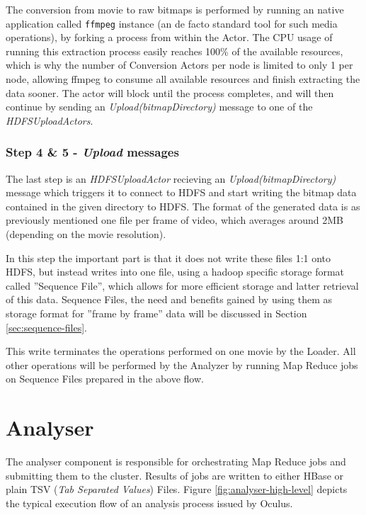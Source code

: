 The conversion from movie to raw bitmaps is performed by running an native application called \verb|ffmpeg| \cite{ffmpeg} instance (an de facto standard tool for such media operations), by forking a process from within the Actor. The CPU usage of running this extraction process easily reaches 100\% of the available resources, which is why the number of Conversion Actors per node is limited to only 1 per node, allowing ffmpeg to consume all available resources and finish extracting the data sooner. The actor will block until the process completes, and will then continue by sending an \textit{Upload(bitmapDirectory)} message to one of the \textit{HDFSUploadActors}.

\subsubsection{Step 4 \& 5 - \textit{Upload} messages}
The last step is an \textit{HDFSUploadActor} recieving an \textit{Upload(bitmapDirectory)} message which triggers it to connect to HDFS and start writing the bitmap data contained in the given directory to HDFS. The format of the generated data is as previously mentioned one file per frame of video, which averages around 2MB (depending on the movie resolution).

In this step the important part is that it does not write these files 1:1 onto HDFS, but instead writes into one file, using a hadoop specific storage format called ''Sequence File'', which allows for more efficient storage and latter retrieval of this data. Sequence Files, the need and benefits gained by using them as storage format for ''frame by frame'' data will be discussed in Section \ref{sec:sequence-files}.

This write terminates the operations performed on one movie by the Loader. All other operations will be performed by the Analyzer by running Map Reduce jobs on Sequence Files prepared in the above flow.

\section{Analyser}
\label{sec:analyser}
The analyser component is responsible for orchestrating Map Reduce jobs and submitting them to the cluster. Results of jobs are written to either HBase or plain TSV (\textit{Tab Separated Values}) Files. Figure \ref{fig:analyser-high-level} depicts the typical execution flow of an analysis process issued by Oculus.

